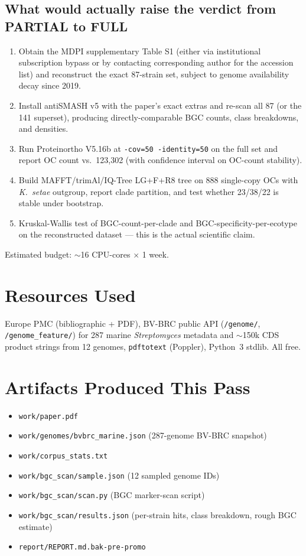 \documentclass[11pt,letterpaper]{article}
\begin{document}
\subsection{What would actually raise the verdict from PARTIAL to FULL}
\begin{enumerate}
\item Obtain the MDPI supplementary Table S1 (either via institutional subscription bypass or by contacting corresponding author for the accession list) and reconstruct the exact 87-strain set, subject to genome availability decay since 2019.
\item Install antiSMASH v5 with the paper's exact extras and re-scan all 87 (or the 141 superset), producing directly-comparable BGC counts, class breakdowns, and densities.
\item Run Proteinortho V5.16b at \texttt{-cov=50 -identity=50} on the full set and report OC count vs.\ 123{,}302 (with confidence interval on OC-count stability).
\item Build MAFFT/trimAl/IQ-Tree LG+F+R8 tree on 888 single-copy OCs with \textit{K.\ setae} outgroup, report clade partition, and test whether 23/38/22 is stable under bootstrap.
\item Kruskal-Wallis test of BGC-count-per-clade and BGC-specificity-per-ecotype on the reconstructed dataset --- this is the actual scientific claim.
\end{enumerate}
Estimated budget: $\sim$16 CPU-cores $\times$ 1 week.

\section{Resources Used}
Europe PMC (bibliographic + PDF), BV-BRC public API (\texttt{/genome/}, \texttt{/genome\_feature/}) for 287 marine \textit{Streptomyces} metadata and $\sim$150k CDS product strings from 12 genomes, \texttt{pdftotext} (Poppler), Python~3 stdlib. All free.

\section{Artifacts Produced This Pass}
\begin{itemize}
\item \texttt{work/paper.pdf}
\item \texttt{work/genomes/bvbrc\_marine.json} (287-genome BV-BRC snapshot)
\item \texttt{work/corpus\_stats.txt}
\item \texttt{work/bgc\_scan/sample.json} (12 sampled genome IDs)
\item \texttt{work/bgc\_scan/scan.py} (BGC marker-scan script)
\item \texttt{work/bgc\_scan/results.json} (per-strain hits, class breakdown, rough BGC estimate)
\item \texttt{report/REPORT.md.bak-pre-promo}
\end{itemize}
\end{document}
